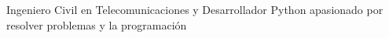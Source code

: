 Ingeniero Civil en Telecomunicaciones y Desarrollador Python apasionado por resolver problemas y la programación